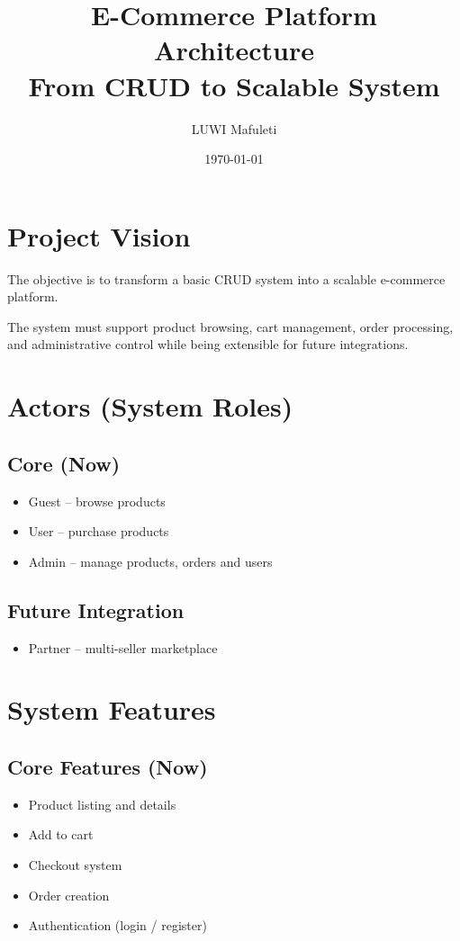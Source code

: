 \documentclass[12pt,a4paper]{article}
\title{\textcolor{mainblue}{E-Commerce Platform Architecture} \\
\large From CRUD to Scalable System}
\author{LUWI Mafuleti}
\date{\today}
\begin{document}
\maketitle
\tableofcontents
\newpage

\section{Project Vision}

The objective is to transform a basic CRUD system into a scalable e-commerce platform.

The system must support product browsing, cart management, order processing, and administrative control while being extensible for future integrations.

\section{Actors (System Roles)}

\subsection{Core (Now)}
\begin{itemize}[noitemsep]
    \item Guest – browse products
    \item User – purchase products
    \item Admin – manage products, orders and users
\end{itemize}

\subsection{Future Integration}
\begin{itemize}[noitemsep]
    \item Partner – multi-seller marketplace
\end{itemize}

\section{System Features}

\subsection{Core Features (Now)}
\begin{itemize}[noitemsep]
    \item Product listing and details
    \item Add to cart
    \item Checkout system
    \item Order creation
    \item Authentication (login / register)
\end{itemize}
\end{document}

